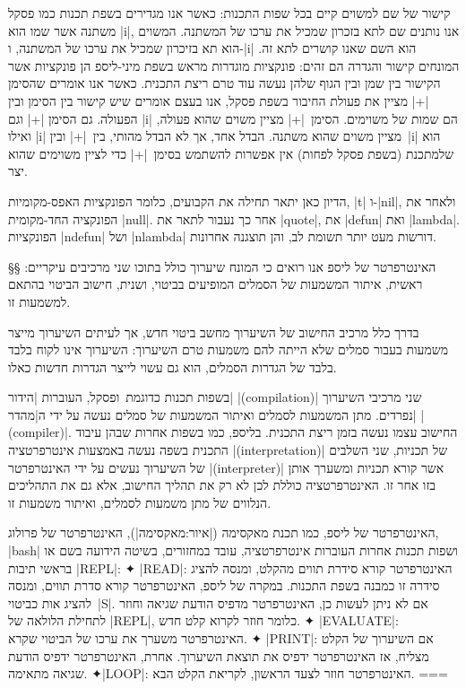 קישור של שם למשוים קיים בכל שפות התכנות: כאשר אנו מגדירים בשפת תכנות כמו פסקל
משתנה אשר שמו הוא \T|i|, אנו נותנים שם לתא בזכרון שמכיל את ערכו של המשתנה.
המשוים הוא תא בזיכרון שמכיל את ערכו של המשתנה, ו-\T|i| הוא השם שאנו קושרים לתא
זה. המונחים קישור והגדרה הם זהים: פונקציות מוגדרות מראש בשפת מיני-ליספ הן
פונקציות אשר הקישור בין שמן ובין הגוף שלהן נעשה עוד טרם ריצת התכנית. כאשר אנו
אומרים שהסימן \T|+| מציין את פעולת החיבור בשפת פסקל, אנו בעצם אומרים שיש קישור
בין הסימן ובין הפעולה. גם הסימן \T|+| וגם \T|i| הם שמות של משוימים. הסימן~\T|+|
מציין משוים שהוא פעולה, ואילו \T|i| מציין משוים שהוא משתנה. הבדל אחד, אך לא
הבדל מהותי, בין~\T|+| ובין~\T|i| הוא שלמתכנת (בשפת פסקל לפחות) אין אפשרות
להשתמש בסימן~\T|+| כדי לציין משוימים שהוא יצר.

הדיון כאן יתאר תחילה את הקבועים, כלומר הפונקציות האפס-מקומיות, \E|t| ו-\E|nil|,
ולאחר את הפונקציה החד-מקומית \E|null|. אחר כך נעבור לתאר את \E|quote|, את
\E|defun| ואת \E|lambda|. הפונקציות \E|ndefun| ושל \E|nlambda| דורשות מעט יותר
תשומת לב, והן תוצגנה אחרונות.

§§ האינטרפרטר של ליספ
אנו רואים כי המונח שיערוך כולל בתוכו שני מרכיבים עיקריים: ראשית, איתור המשמעות
של הסמלים המופיעים בביטוי, ושנית, חישוב הביטוי בהתאם למשמעות זו.

בדרך כלל מרכיב החישוב של השיערוך מחשב ביטוי חדש, אך לעיתים השיערוך מייצר משמעות
בעבור סמלים שלא הייתה להם משמעות טרם השיערוך: השיערוך אינו לקוח בלבד
בלבד של הגדרות הסמלים, הוא גם עשוי לייצר הגדרות חדשות כאלו.

בשפות תכנות כדוגמת~\CPL ופסקל, העוברות \ע|הידור| \E|(compilation)| שני מרכיבי
השיערוך נפרדים. מתן המשמעות לסמלים ואיתור המשמעות של סמלים נעשה על ידי
ה\ע|מהדר| \E|(compiler)|. החישוב עצמו נעשה בזמן ריצת התכנית. בליספ, כמו בשפות
אחרות שבהן עיבוד התכנית בשפה נעשה באמצעות אינטרפרטציה \E|(interpretation)| של
תכניות, שני השלבים של השיערוך נעשים על ידי האינטרפרטר \E|(interpreter)| אשר
קורא תכניות ומשערך אותן בזו אחר זו. האינטרפרטציה כוללת לכן לא רק את תהליך
החישוב, אלא גם את התהליכים הנלווים של מתן משמעות לסמלים, ואיתור משמעות זו.

\begin{minipage}{0.9\linewidth}
  \centering
  \footnotesize
\begin{mdframed}[backgroundcolor=Lavender!20]
    האינטרפרטר של ליספ, כמו תכנת מאקסימה (|איור:מאקסימה|), האינטרפרטר של
    פרולוג, \E|bash| ושפות תכנות אחרות העוברות אינטרפרטציה, עובד במחזורים,
    בשיטה הידועה בשם
    או בראשי תיבות \E|REPL|:
    ✦ \E|READ|: האינטרפרטר קורא סידרת תווים מהקלט, ומנסה להציג סידרה זו כמבנה
    בשפת התכנות. במקרה של ליספ, האינטרפרטר קורא סדרת תווים, ומנסה להציג
    אות כביטוי~\E|S|. אם לא ניתן לעשות כן, האינטרפרטר מדפיס הודעת שגיאה וחוזר
    לתחילת הלולאה של \E|REPL|, כלומר חוזר לקרוא קלט חדש.
    ✦ \E|EVALUATE|: האינטרפרטר משערך את ערכו של הביטוי שקרא.
    ✦ \E|PRINT|: אם השיערוך של הקלט מצליח, אז האינטרפרטר ידפיס את תוצאת
    השיערוך. אחרת, האינטרפרטר ידפיס הודעת שגיאה מתאימה.
    ✦\E|LOOP|: האינטרפרטר חוזר לצעד הראשון, לקריאת הקלט הבא.
===
  \end{mdframed}
\end{minipage}

